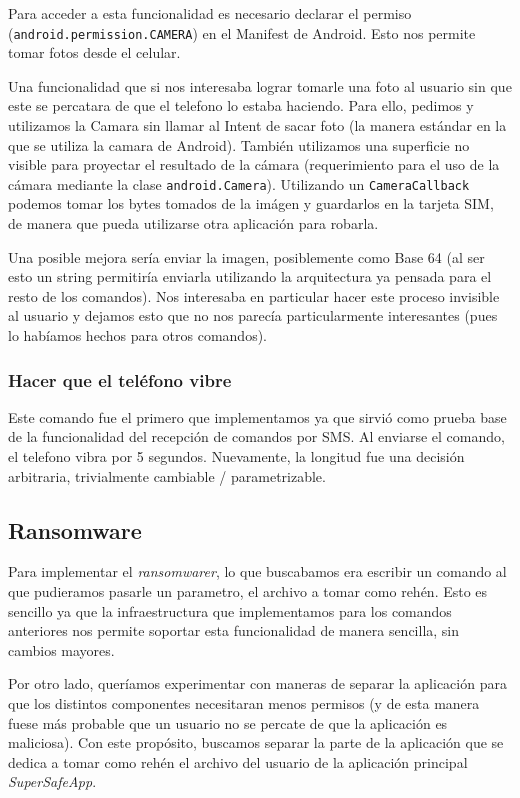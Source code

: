 Para acceder a esta funcionalidad es necesario declarar el permiso
(\texttt{android.permission.CAMERA}) en el Manifest de Android. Esto nos permite
tomar fotos desde el celular.

Una funcionalidad que si nos interesaba lograr tomarle una foto al usuario sin que este se percatara
de que el telefono lo estaba haciendo. Para ello, pedimos y utilizamos la Camara
sin llamar al Intent de sacar foto (la manera estándar en la que se utiliza la
camara de Android). También utilizamos una superficie no visible para proyectar
el resultado de la cámara (requerimiento para el uso de la cámara mediante la
clase \texttt{android.Camera}). Utilizando un \texttt{CameraCallback} podemos
tomar los bytes tomados de la imágen y guardarlos en la tarjeta SIM, de manera
que pueda utilizarse otra aplicación para robarla.

Una posible mejora sería enviar la imagen, posiblemente como Base 64 (al ser
esto un string permitiría enviarla utilizando la arquitectura ya pensada para
el resto de los comandos). Nos interesaba en particular hacer este proceso
invisible al usuario y dejamos esto que no nos parecía particularmente interesantes
(pues lo habíamos hechos para otros comandos).

\subsubsection{Hacer que el teléfono vibre}

Este comando fue el primero que implementamos ya que sirvió como prueba base de la
funcionalidad del recepción de comandos por SMS. Al enviarse el comando, el telefono
vibra por 5 segundos. Nuevamente, la longitud fue una decisión arbitraria, trivialmente cambiable / parametrizable.

\subsection{Ransomware}

Para implementar el \textit{ransomwarer}, lo que buscabamos era escribir un comando al que pudieramos pasarle un parametro, el archivo
a tomar como rehén. Esto es sencillo ya que la infraestructura que implementamos para los comandos anteriores nos permite soportar esta
funcionalidad de manera sencilla, sin cambios mayores.

Por otro lado, queríamos experimentar con maneras de separar la aplicación para que los distintos componentes necesitaran menos permisos
(y de esta manera fuese más probable que un usuario no se percate de que la aplicación es maliciosa). Con este propósito, buscamos separar
la parte de la aplicación que se dedica a tomar como rehén el archivo del usuario de la aplicación principal \textit{SuperSafeApp}.

